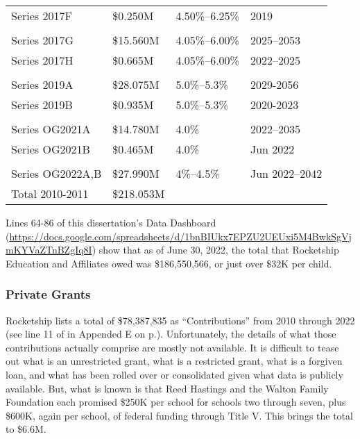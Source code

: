 \begin{table}[ht]
\begin{tabular}{llll}
    Series 2017F     & \$0.250M  & 4.50\%–6.25\%  & 2019               \\
                                                                       \\
    Series 2017G     & \$15.560M & 4.05\%–6.00\%  & 2025–2053          \\
    Series 2017H     & \$0.665M  &  4.05\%–6.00\% & 2022–2025          \\
                                                                       \\
    Series 2019A     & \$28.075M & 5.0\%–5.3\%    & 2029-2056          \\
    Series 2019B     & \$0.935M  & 5.0\%–5.3\%    & 2020-2023          \\
                                                                       \\
    Series OG2021A   & \$14.780M & 4.0\%          & 2022–2035          \\
    Series OG2021B   & \$0.465M  & 4.0\%          & Jun 2022           \\
                                                                       \\
    Series OG2022A,B & \$27.990M & 4\%–4.5\%      & Jun 2022–2042      \\
    \midrule
    Total 2010-2011  & \$218.053M                                      \\
    \bottomrule
  \end{tabular}
\end{table}

Lines 64-86 of this dissertation's Data Dashboard (\url{https://docs.google.com/spreadsheets/d/1bnBIUkx7EPZU2UEUxi5M4BwkSgVjmKYVaZTnBZgIq8I}) show that as of June 30, 2022, the total that Rocketship Education and Affiliates owed was \$186,550,566, or just over \$32K per child.

\subsubsection{Private Grants}%
\label{sec:private-grants}\indent%

Rocketship lists a total of \$78,387,835 as ``Contributions'' from 2010 through 2022 (see line 11 of  in Appended E on p.\pageref{tab:consolidated_activities}). Unfortunately, the details of what those contributions actually comprise are mostly not available. It is difficult to tease out what is an unrestricted grant, what is a restricted grant, what is a forgiven loan, and what has been rolled over or consolidated given what data is publicly available. But, what is known is that Reed Hastings and the Walton Family Foundation each promised \$250K per school for schools two through seven, plus \$600K, again per school, of federal funding through Title V. This brings the total to \$6.6M.

